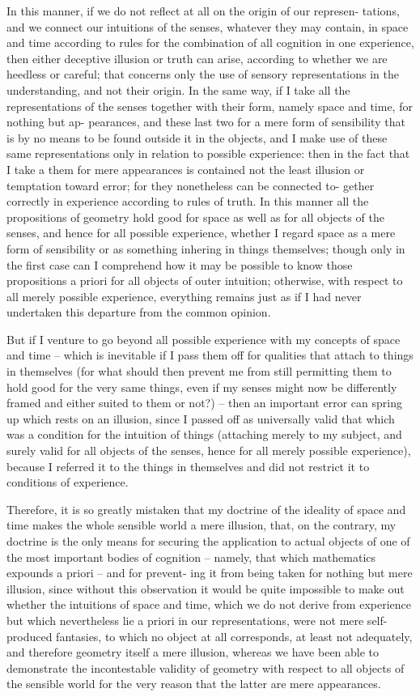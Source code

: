 In this manner, if we do not reﬂect at all on the origin of our represen-
tations, and we connect our intuitions of the senses, whatever they may
contain, in space and time according to rules for the combination of all
cognition in one experience, then either deceptive illusion or truth can
arise, according to whether we are heedless or careful; that concerns only
the use of sensory representations in the understanding, and not their
origin. In the same way, if I take all the representations of the senses
together with their form, namely space and time, for nothing but ap-
pearances, and these last two for a mere form of sensibility that is by no
means to be found outside it in the objects, and I make use of these same
representations only in relation to possible experience: then in the fact
that I take a them for mere appearances is contained not the least illusion
or temptation toward error; for they nonetheless can be connected to-
gether correctly in experience according to rules of truth. In this manner
all the propositions of geometry hold good for space as well as for all
objects of the senses, and hence for all possible experience, whether I
regard space as a mere form of sensibility or as something inhering in
things themselves; though only in the ﬁrst case can I comprehend how
it may be possible to know those propositions a priori for all objects of
outer intuition; otherwise, with respect to all merely possible experience,
everything remains just as if I had never undertaken this departure from
the common opinion.

But if I venture to go beyond all possible experience with my concepts
of space and time – which is inevitable if I pass them off for qualities that
attach to things in themselves (for what should then prevent me from
still permitting them to hold good for the very same things, even if my
senses might now be differently framed and either suited to them or
not?) – then an important error can spring up which rests on an illusion,
since I passed off as universally valid that which was a condition for the
intuition of things (attaching merely to my subject, and surely valid for all
objects of the senses, hence for all merely possible experience), because I
referred it to the things in themselves and did not restrict it to conditions
of experience.

Therefore, it is so greatly mistaken that my doctrine of the ideality of
space and time makes the whole sensible world a mere illusion, that, on
the contrary, my doctrine is the only means for securing the application
to actual objects of one of the most important bodies of cognition –
namely, that which mathematics expounds a priori – and for prevent-
ing it from being taken for nothing but mere illusion, since without
this observation it would be quite impossible to make out whether the
intuitions of space and time, which we do not derive from experience
but which nevertheless lie a priori in our representations, were not mere
self-produced fantasies, to which no object at all corresponds, at least
not adequately, and therefore geometry itself a mere illusion, whereas
we have been able to demonstrate the incontestable validity of geometry
with respect to all objects of the sensible world for the very reason that
the latter are mere appearances.

